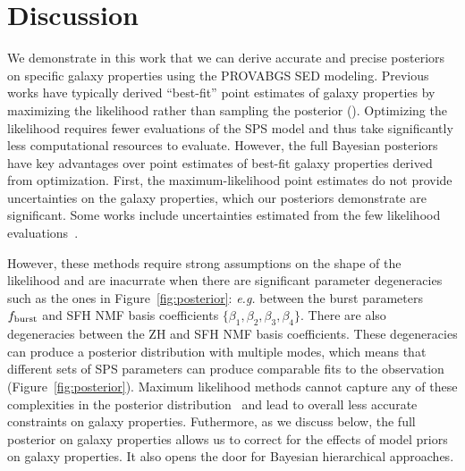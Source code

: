 \section{Discussion} \label{sec:discuss}
We demonstrate in this work that we can derive accurate and precise posteriors
on specific galaxy properties using the {\sc PROVABGS} SED modeling. 
Previous works have typically derived ``best-fit'' point estimates of galaxy
properties by maximizing the likelihood rather than sampling the posterior
(). 
Optimizing the likelihood requires fewer evaluations of the SPS model and thus
take significantly less computational resources to evaluate. 
However, the full Bayesian posteriors  have key advantages over point estimates
of best-fit galaxy properties derived from optimization. 
First, the maximum-likelihood point estimates do not provide uncertainties on
the galaxy properties, which our posteriors demonstrate are significant. 
Some works include uncertainties estimated from the few likelihood
evaluations~\citep[\emph{e.g.}][]{moustakas2013, boquien2019}. 

However, these methods require strong assumptions on the shape of the
likelihood and are inacurrate when there are significant parameter
degeneracies such as the ones in Figure~\ref{fig:posterior}: \emph{e.g.}
between the burst parameters $f_{\rm burst}$ and SFH NMF basis coefficients
$\{\beta_1, \beta_2, \beta_3, \beta_4\}$. 
There are also degeneracies between the ZH and SFH NMF basis coefficients.
These degeneracies can produce a posterior distribution with multiple modes,
which means that different sets of SPS parameters can produce comparable fits
to the observation (Figure~\ref{fig:posterior}). 
Maximum likelihood methods cannot capture any of these complexities in the
posterior distribution~\citep[\emph{e.g.}][]{boquien2019} and lead to overall
less accurate constraints on galaxy properties.  
Futhermore, as we discuss below, the full posterior on galaxy properties allows
us to correct for the effects of model priors on galaxy properties. 
It also opens the door for Bayesian hierarchical approaches.  




